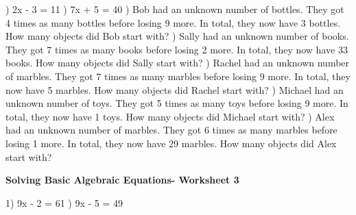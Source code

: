 \documentclass{article}%
\begin{document}
) 2x - 3 = 11%
\newline%
\newline%
) 7x + 5 = 40%
\newline%
\newline%
) Bob had an unknown number of bottles. They got 4 times as many bottles before losing 9 more. In total, they now have 3 bottles. How many objects did Bob start with?%
\newline%
\newline%
) Sally had an unknown number of books. They got 7 times as many books before losing 2 more. In total, they now have 33 books. How many objects did Sally start with?%
\newline%
\newline%
) Rachel had an unknown number of marbles. They got 7 times as many marbles before losing 9 more. In total, they now have 5 marbles. How many objects did Rachel start with?%
\newline%
\newline%
) Michael had an unknown number of toys. They got 5 times as many toys before losing 9 more. In total, they now have 1 toys. How many objects did Michael start with?%
\newline%
\newline%
) Alex had an unknown number of marbles. They got 6 times as many marbles before losing 1 more. In total, they now have 29 marbles. How many objects did Alex start with?%
\newline%
\newline%
\newline%
\pagebreak%
\large%
\begin{center}%
\textbf{Solving Basic Algebraic Equations- Worksheet 3}%
\newline%
\newline%
\newline%
\end{center} \normalsize%
1) 9x - 2 = 61%
\newline%
\newline%
) 9x - 5 = 49%
\newline%
\newline%
\end{document}
